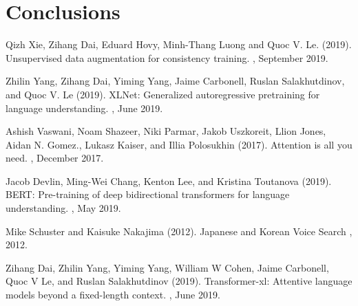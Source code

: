 \documentclass[twoside,twocolumn,10pt]{article}
\begin{document}
\section{Conclusions} \label{conclusions}





\begin{thebibliography}{99} %

Qizh Xie, Zihang Dai, Eduard Hovy, Minh-Thang Luong and Quoc V. Le. (2019).
\newblock Unsupervised data augmentation for consistency training.
, September 2019.

Zhilin Yang, Zihang Dai, Yiming Yang, Jaime Carbonell, Ruslan Salakhutdinov, and Quoc V. Le (2019).
\newblock XLNet: Generalized autoregressive pretraining for language understanding.
, June 2019.

Ashish Vaswani, Noam Shazeer, Niki Parmar, Jakob Uszkoreit, Llion Jones, Aidan N. Gomez., Lukasz Kaiser, and Illia Polosukhin (2017).
\newblock Attention is all you need.
, December 2017.

Jacob Devlin, Ming-Wei Chang, Kenton Lee, and Kristina Toutanova (2019).
\newblock BERT: Pre-training of deep bidirectional transformers for language understanding.
, May 2019.

Mike Schuster and Kaisuke Nakajima (2012).
\newblock Japanese and Korean Voice Search
 , 2012.
 
Zihang Dai, Zhilin Yang, Yiming Yang, William W Cohen, Jaime Carbonell, Quoc V Le,
and Ruslan Salakhutdinov (2019).
\newblock Transformer-xl: Attentive language models beyond a fixed-length
 context. 
, June 2019.


\end{thebibliography}
\end{document}
